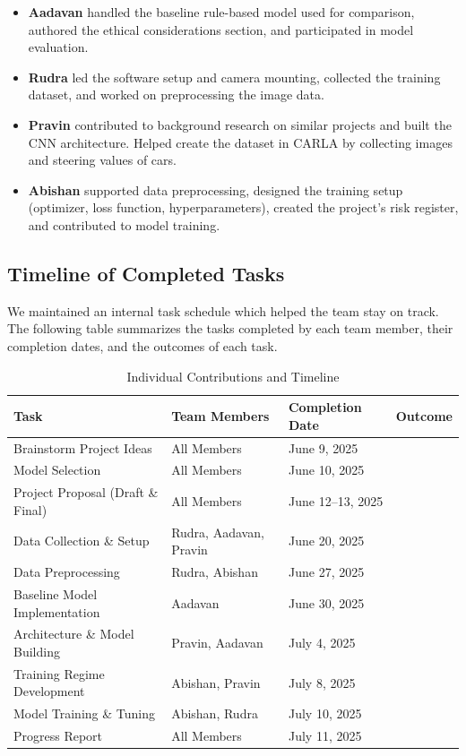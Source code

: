 \documentclass{article} %
\begin{document}
\begin{itemize}
  \item \textbf{Aadavan} handled the baseline rule-based model used for comparison, authored the ethical considerations section, and participated in model evaluation.

  \item \textbf{Rudra} led the software setup and camera mounting, collected the training dataset, and worked on preprocessing the image data.

  \item \textbf{Pravin} contributed to background research on similar projects and built the CNN architecture. Helped create the dataset in CARLA by collecting images and steering values of cars.

  \item \textbf{Abishan} supported data preprocessing, designed the training setup (optimizer, loss function, hyperparameters), created the project's risk register, and contributed to model training.
\end{itemize}

\subsection{Timeline of Completed Tasks}

We maintained an internal task schedule which helped the team stay on track. The following table summarizes the tasks completed by each team member, their completion dates, and the outcomes of each task.

\begin{table}[h]
\centering
\caption{Individual Contributions and Timeline}
\vspace{0.5em}
\begin{tabular}{|p{4.5cm}|p{3cm}|p{3cm}|p{3cm}|}
\hline
\textbf{Task} & \textbf{Team Members} & \textbf{Completion Date} & \textbf{Outcome} \\ \hline
Brainstorm Project Ideas & All Members & June 9, 2025 & \\ \hline
Model Selection & All Members & June 10, 2025 & \\ \hline
Project Proposal (Draft \& Final) & All Members & June 12–13, 2025 & \\ \hline
Data Collection \& Setup & Rudra, Aadavan, Pravin & June 20, 2025 & \\ \hline
Data Preprocessing & Rudra, Abishan & June 27, 2025 & \\ \hline
Baseline Model Implementation & Aadavan & June 30, 2025 & \\ \hline
Architecture \& Model Building & Pravin, Aadavan & July 4, 2025 & \\ \hline
Training Regime Development & Abishan, Pravin & July 8, 2025 & \\ \hline
Model Training \& Tuning & Abishan, Rudra & July 10, 2025 & \\ \hline
Progress Report & All Members & July 11, 2025 & \\ \hline
\end{tabular}
\end{table}
\end{document}
